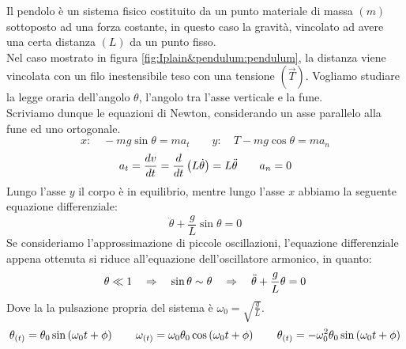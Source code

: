 Il pendolo è un sistema fisico costituito da un punto materiale di massa
$(m)$ sottoposto ad una forza costante, in questo caso la gravità, vincolato
ad avere una certa distanza $(L)$ da un punto fisso.\\
Nel caso mostrato in figura \ref{fig:Iplain&pendulum:pendulum}, la distanza
viene vincolata con un filo inestensibile teso con una tensione $(\vec T)$.
Vogliamo studiare la legge oraria dell'angolo $\theta$, l'angolo tra l'asse
verticale e la fune.\\
Scriviamo dunque le equazioni di Newton, considerando un asse parallelo alla
fune ed uno ortogonale.
\begin{equation}
    x:\quad -mg\sin\theta = ma_t\quad\quad y:\quad T-mg\cos\theta = ma_n
\end{equation}
\begin{equation}
    a_t = \frac{dv}{dt}=\frac d{dt}\left( L\dot\theta\right)=
    L\ddot\theta\quad\quad a_n = 0
\end{equation}
Lungo l'asse $y$ il corpo è in equilibrio, mentre lungo l'asse $x$ abbiamo
la seguente equazione differenziale:
\begin{equation}
    \boxed{\ddot\theta + \frac gL\sin\theta = 0}
\label{eq:pendulum_DE}
\end{equation}
Se consideriamo l'approssimazione di piccole oscillazioni, l'equazione differenziale appena ottenuta si riduce all'equazione dell'oscillatore armonico, in quanto:
\begin{equation}
    \theta \ll 1 \quad\Rightarrow\quad \sin\theta \sim \theta \quad\Rightarrow\quad
    \ddot\theta + \frac gL\theta = 0
\label{eq:pendulum_ODE}
\end{equation}
Dove la la pulsazione propria del sistema è $\omega_0 = \sqrt{\frac gL}$.
\begin{equation}
    \theta_{(t)} = \theta_0\sin\left(\omega_0t+\phi\right)\quad\quad
    \omega_{(t)} = \omega_0\theta_0\cos\left(\omega_0t+\phi\right)\quad\quad
    \theta_{(t)} =-\omega_0^2 \theta_0\sin\left(\omega_0t+\phi\right)
\end{equation}